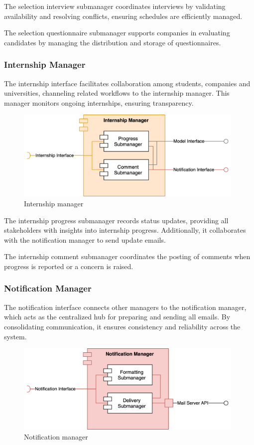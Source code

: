 The selection interview submanager coordinates interviews by validating availability and resolving conflicts, ensuring schedules are efficiently managed.

The selection questionnaire submanager supports companies in evaluating candidates by managing the distribution and storage of questionnaires.

\subsubsection{Internship Manager}
The internship interface facilitates collaboration among students, companies and universities, channeling related workflows to the internship manager.
This manager monitors ongoing internships, ensuring transparency.

\begin{figure}[h]
    \centering
    \includegraphics[width=11cm]{images/managers/internship.png}
    \caption{Internship manager}
\end{figure}

The internship progress submanager records status updates, providing all stakeholders with insights into internship progress.
Additionally, it collaborates with the notification manager to send update emails.

The internship comment submanager coordinates the posting of comments when progress is reported or a concern is raised.

\subsubsection{Notification Manager}
The notification interface connects other managers to the notification manager, which acts as the centralized hub for preparing and sending all emails.
By consolidating communication, it ensures consistency and reliability across the system.

\begin{figure}[h]
    \centering
    \includegraphics[width=11cm]{images/managers/notification.png}
    \caption{Notification manager}
\end{figure}

